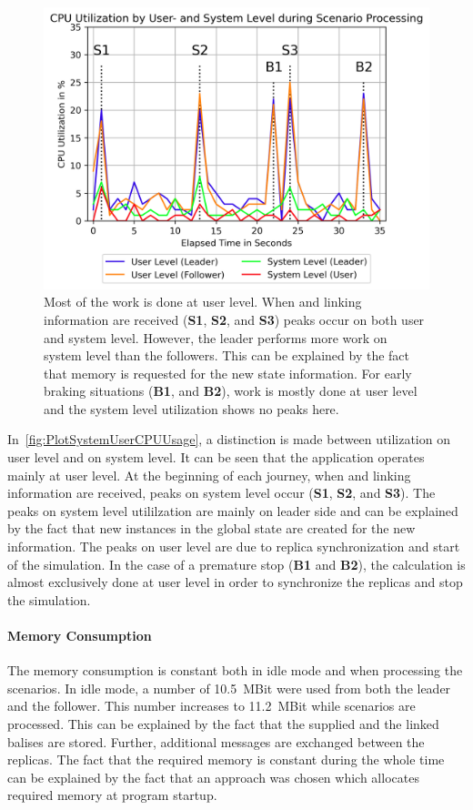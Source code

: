 \begin{figure}[!hb]
	\centering
	\includegraphics[width=0.8\linewidth]{images/plots/SystemUserCPUUsage}
	\caption{Most of the  work is done at user level. When  and linking information are received (\textbf{S1}, \textbf{S2}, and \textbf{S3}) peaks occur on both user and system level. However, the leader performs more work on system level than the followers. This can be explained by the fact that memory is requested for the new state information. For early braking situations (\textbf{B1}, and \textbf{B2}), work is mostly done at user level and the system level utilization shows no peaks here.}
	\label{fig:PlotSystemUserCPUUsage}
\end{figure}

In~\autoref{fig:PlotSystemUserCPUUsage}, a distinction is made between  utilization on user level and on system level.
It can be seen that the application operates mainly at user level.
At the beginning of each journey, when  and linking information are received, peaks on system level occur (\textbf{S1}, \textbf{S2}, and \textbf{S3}).
The peaks on system level utililzation are mainly on leader side and can be explained by the fact that new instances in the global state are created for the new information.
The peaks on user level are due to replica synchronization and start of the simulation.
In the case of a premature stop (\textbf{B1} and \textbf{B2}), the calculation is almost exclusively done at user level in order to synchronize the replicas and stop the simulation.

\paragraph{Memory Consumption}
The memory consumption is constant both in idle mode and when processing the scenarios.
In idle mode, a number of 10.5~MBit were used from both the leader and the follower.
This number increases to 11.2~MBit while scenarios are processed.
This can be explained by the fact that the supplied  and the linked balises are stored.
Further, additional messages are exchanged between the replicas.
The fact that the required memory is constant during the whole time can be explained by the fact that an approach was chosen which allocates required memory at program startup.



